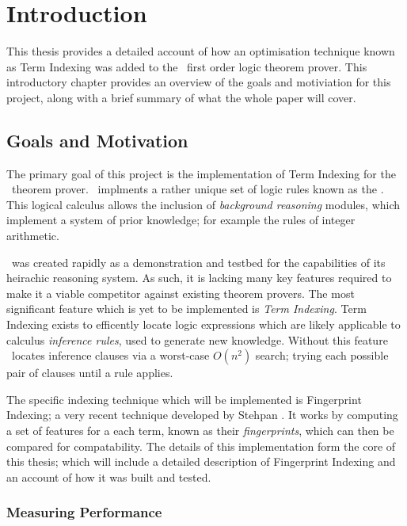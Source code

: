 
\chapter{Introduction}
\label{cha:intro}

This thesis provides a detailed account of how an optimisation technique known
as Term Indexing was added to the \beagle\ first order logic theorem prover. This
introductory chapter provides an overview of the goals and motiviation for this project,
along with a brief summary of what the whole paper will cover.

\section{Goals and Motivation}
\label{sec:mot}

The primary goal of this project is the implementation of Term Indexing
for the \beagle\ theorem prover. \Beagle\ implments a rather unique set of logic rules known as the \emph{\HSWAC} \cite{baum13}.
This logical calculus allows the inclusion of \emph{background reasoning} modules,
which implement a system of prior knowledge; for example the rules of integer arithmetic.

\Beagle\ was created rapidly as a demonstration and testbed for the capabilities
of its heirachic reasoning system. As such, it is lacking many key features required
to make it a viable competitor against existing theorem provers. The most significant
feature which is yet to be implemented is \emph{Term Indexing}. Term Indexing exists
to efficently locate logic expressions which are likely applicable to calculus \emph{inference rules},
used to generate new knowledge. Without this feature \beagle\ locates inference clauses
via a worst-case $O(n^2)$ search; trying each possible pair of clauses until a rule applies.

The specific indexing technique which will be implemented is Fingerprint Indexing;
a very recent technique developed by Stehpan . It works by computing
a set of features for a each term, known as their \emph{fingerprints}, which can then
be compared for compatability. The details of this implementation form the core
of this thesis; which will include a detailed description of Fingerprint Indexing
and an account of how it was built and tested.

\subsection{Measuring Performance}

